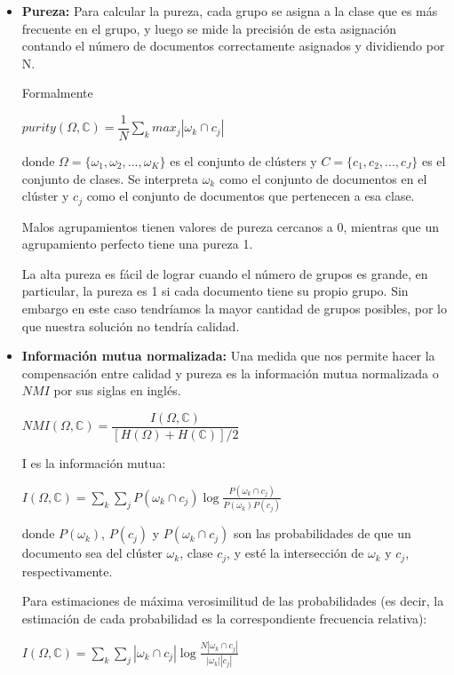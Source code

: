 \documentclass{llncs}
\begin{document}
\begin{itemize}
	\item \textbf{Pureza:} Para calcular la pureza, cada grupo se asigna a la clase que es más frecuente en el grupo, y luego se mide la precisión de esta asignación contando el número de documentos correctamente asignados y dividiendo por N.
	
	Formalmente
	
	\begin{center}
		$purity(\Omega, \mathbb{C}) = \dfrac{1}{N} \sum_{k}max_{j} |\omega_{k} \cap c_{j}| $
	\end{center}
	donde $ \Omega = \{\omega_{1}, \omega_{2}, ... , \omega_{K}\} $ es el conjunto de cl\'usters y $ C = \{c_{1}, c_{2}, ... , c_{J}\} $ es el conjunto de clases. Se interpreta $ \omega_{k} $ como el conjunto de documentos en el cl\'uster y $ c_{j} $ como el conjunto de documentos que pertenecen a esa clase.
	
	Malos agrupamientos tienen valores de pureza cercanos a 0, mientras que un agrupamiento perfecto tiene una pureza 1.
	
	La alta pureza es fácil de lograr cuando el número de grupos es grande, en particular, la pureza es 1 si cada documento tiene su propio grupo. Sin embargo en este caso tendr\'iamos la mayor cantidad de grupos posibles, por lo que nuestra soluci\'on no tendr\'ia calidad.
	\vspace{1em}
	\item \textbf{Información mutua normalizada:} Una medida que nos permite hacer la compensaci\'on entre calidad y pureza es la información mutua normalizada o $ NMI $ por sus siglas en ingl\'es.
	
\begin{center}
		$ NMI(\Omega, \mathbb{C}) = \dfrac{I(\Omega, \mathbb{C})}{[H(\Omega) + H(\mathbb{C})]/2}
	 $
\end{center}
	
	I es la informaci\'on mutua:
	\begin{center}
		$ I(\Omega, \mathbb{C}) = \sum_{k}\sum_{j}P(\omega_{k} \cap c_{j})\log\frac{P(\omega_{k} \cap c_{j})}{P(\omega_{k})P(c_{j})} $
	\end{center}
	donde $ P(\omega_{k}) $, $ P(c_{j}) $ y $ P(\omega_{k} \cap c_{j}) $ son las probabilidades de que un documento sea del cl\'uster $ \omega_{k} $, clase $ c_{j} $, y est\'e la intersección de $ \omega_{k} $ y $ c_{j} $, respectivamente.
	
	\vspace{0.5em}
	Para estimaciones de máxima verosimilitud
	de las probabilidades (es decir, la estimación de cada probabilidad es la correspondiente frecuencia relativa):
	\begin{center}
		$ I(\Omega, \mathbb{C}) = \sum_{k}\sum_{j}|\omega_{k} \cap c_{j}|\log\frac{N|\omega_{k} \cap c_{j}|}{|\omega_{k}||c_{j}|} $
	\end{center}
	

\end{itemize}
\end{document}
